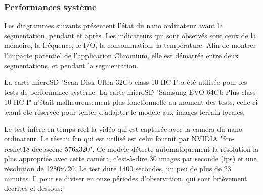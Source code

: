 \subsubsection{Performances système}
\par Les diagrammes suivants présentent l'état du nano ordinateur avant la segmentation, pendant et après. Les indicateurs qui sont observés sont ceux de la mémoire, la fréquence, le I/O, la consommation, la température. Afin de montrer l'impacte potentiel de l'application Chromium, elle est démarrée entre deux segmentations, et pendant la segmentation. 
\par La carte microSD "Scan Disk Ultra 32Gb class 10 HC I" a été utilisée pour les tests de performance système. La carte microSD "Samsung EVO 64Gb Plus class 10 HC I" n'était malheureusement plus fonctionnelle au moment des tests, celle-ci ayant été réservée pour tenter d'adapter le modèle aux images terrain locales. 
\par Le test infère en temps réel la vidéo qui est capturée avec la caméra du nano ordinateur. Le réseau \acrshort{fcn} qui est utilisé est celui fournit par NVIDIA "fcn-resnet18-deepscene-576x320". Ce modèle détecte automatiquement la résolution la plus appropriée avec cette caméra, c'est-à-dire 30 images par seconde (\acrshort{fps}) et une résolution de 1280x720. Le test dure 1400 secondes, un peu de plus de 23 minutes. Il peut se diviser en onze périodes d'observation, qui sont brièvement décrites ci-dessous: 
